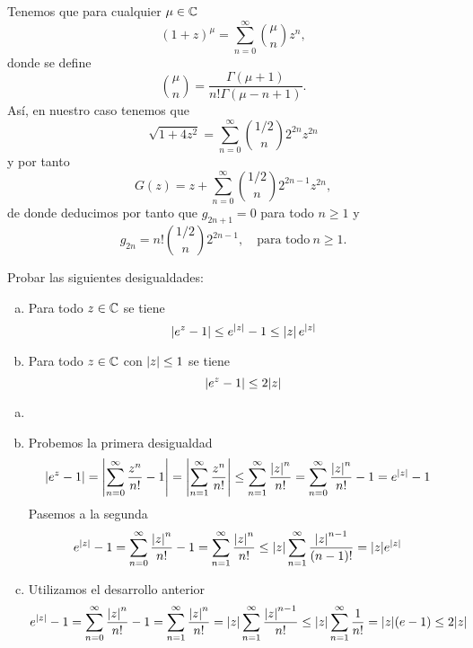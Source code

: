 \documentclass[twoside]{article}
\newcommand{\sumno}{\sum_{n=0}^{\infty}}
\begin{document}
\begin{solucion}
Tenemos que para cualquier $\mu \in \mathbb{C}$ \begin{equation*}
(1+z)^\mu = \sumno \binom{\mu}{n} z^n,
\end{equation*}
donde se define \begin{equation*}
\binom{\mu}{n} = \frac{\Gamma(\mu +1)}{n! \Gamma (\mu - n +1)}.
\end{equation*}
Así, en nuestro caso tenemos que \begin{equation*}
\sqrt{1 + 4z^2} = \sumno \binom{1/2}{n}2^{2n} z^{2n}
\end{equation*}
y por tanto \begin{equation*}
G(z) = z + \sumno \binom{1/2}{n} 2^{2n-1}z^{2n},
\end{equation*}
de donde deducimos por tanto que $g_{2n+1} = 0$ para todo $n \geq 1$ y \begin{equation*}
g_{2n} = n! \binom{1/2}{n} 2^{2n-1}, \quad \text{para todo} \  n \geq 1. 
\end{equation*}
\end{solucion}

\newpage 
\begin{ejercicio}{9}
Probar las siguientes desigualdades:
\begin{enumerate}[(a)]
\item Para todo $z\in \mathbb{C}$ se tiene
$$\left\lvert e^z-1\right\rvert\leq e^{\left\lvert z\right\rvert}-1 \leq \left\lvert z\right\rvert e^{\left\lvert z\right\rvert}
$$
\item Para todo $z\in \mathbb{C}$ con $\left\lvert z\right\rvert\leq 1$ se tiene
$$
\left\lvert e^z-1\right\rvert\leq 2|z|
$$
\end{enumerate}
\end{ejercicio}
\begin{solucion}
\begin{enumerate}[(a)]
\item[]
\item Probemos la primera desigualdad
\begin{align*}
\left\lvert e^z-1\right\rvert &= \left\lvert\sum_{n=0}^\infty \frac{z^n}{n!}-1\right\rvert = \left\lvert\sum_{n=1}^\infty \frac{z^n}{n!}\right\rvert \leq \sum_{n=1}^\infty \frac{\left\lvert z\right\rvert^n}{n!} =  \sum_{n=0}^\infty \frac{\left\lvert z\right\rvert^n}{n!} -1 = e^{\left\lvert z\right\rvert}-1
\end{align*}
Pasemos a la segunda
\begin{align*}
e^{\left\lvert z\right\rvert}-1 &=  \sum_{n=0}^\infty \frac{\left\lvert z\right\rvert^n}{n!} -1 =  \sum_{n=1}^\infty \frac{\left\lvert z\right\rvert^n}{n!} \leq |z|\sum_{n=1}^\infty \frac{\left\lvert z\right\rvert^{n-1}}{(n-1)!} = |z|e^{|z|}
\end{align*}
\item Utilizamos el desarrollo anterior
\begin{align*}
e^{\left\lvert z\right\rvert}-1 &=  \sum_{n=0}^\infty \frac{\left\lvert z\right\rvert^n}{n!} -1 =  \sum_{n=1}^\infty \frac{\left\lvert z\right\rvert^n}{n!} = |z|\sum_{n=1}^\infty \frac{\left\lvert z\right\rvert^{n-1}}{n!} \leq |z|\sum_{n=1}^\infty\frac{1}{n!}= |z|(e-1)\leq 2|z|
\end{align*}
\end{enumerate}
\end{solucion}
\end{document}
